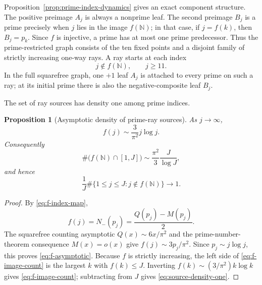 \documentclass[11pt]{amsart}
\numberwithin{equation}{section}
\theoremstyle{plain}
\newtheorem{proposition}[theorem]{Proposition}
\theoremstyle{definition}
\theoremstyle{remark}
\begin{document}
Proposition~\ref{prop:prime-index-dynamics} gives an exact component structure.
The positive preimage $A_j$ is always a nonprime leaf.  The second preimage
$B_j$ is a prime precisely when $j$ lies in the image $f(\mathbb N)$; in that
case, if $j=f(k)$, then $B_j=p_k$.  Since $f$ is injective, a prime has at most
one prime predecessor.  Thus the prime-restricted graph consists of the ten
fixed points and a disjoint family of strictly increasing one-way rays.  A ray
starts at each index
\begin{equation}
\label{eq:prime-source-set}
j\notin f(\mathbb N),\qquad j\ge11.
\end{equation}
In the full squarefree graph, one $+1$ leaf $A_j$ is attached to every prime on
such a ray; at its initial prime there is also the negative-composite leaf
$B_j$.

The set of ray sources has density one among prime indices.

\begin{proposition}[Asymptotic density of prime-ray sources]
\label{prop:prime-source-density}
As $j\to\infty$,
\begin{equation}
\label{eq:f-asymptotic}
f(j)\sim\frac{3}{\pi^2}j\log j.
\end{equation}
Consequently
\begin{equation}
\label{eq:f-image-count}
\#\bigl(f(\mathbb N)\cap[1,J]\bigr)
\sim\frac{\pi^2}{3}\frac{J}{\log J},
\end{equation}
and hence
\begin{equation}
\label{eq:source-density-one}
\frac{1}{J}\#\{1\le j\le J:j\notin f(\mathbb N)\}\longrightarrow1.
\end{equation}
\end{proposition}

\begin{proof}
By \eqref{eq:f-index-map},
\begin{equation}
\label{eq:f-MQ-form}
f(j)=N_-(p_j)=\frac{Q(p_j)-M(p_j)}2.
\end{equation}
The squarefree counting asymptotic $Q(x)\sim6x/\pi^2$ and the prime-number-
theorem consequence $M(x)=o(x)$ give
$f(j)\sim3p_j/\pi^2$.  Since $p_j\sim j\log j$, this proves
\eqref{eq:f-asymptotic}.  Because $f$ is strictly increasing, the left side of
\eqref{eq:f-image-count} is the largest $k$ with $f(k)\le J$.  Inverting
$f(k)\sim(3/\pi^2)k\log k$ gives \eqref{eq:f-image-count}; subtracting from
$J$ gives \eqref{eq:source-density-one}.
\end{proof}
\end{document}
